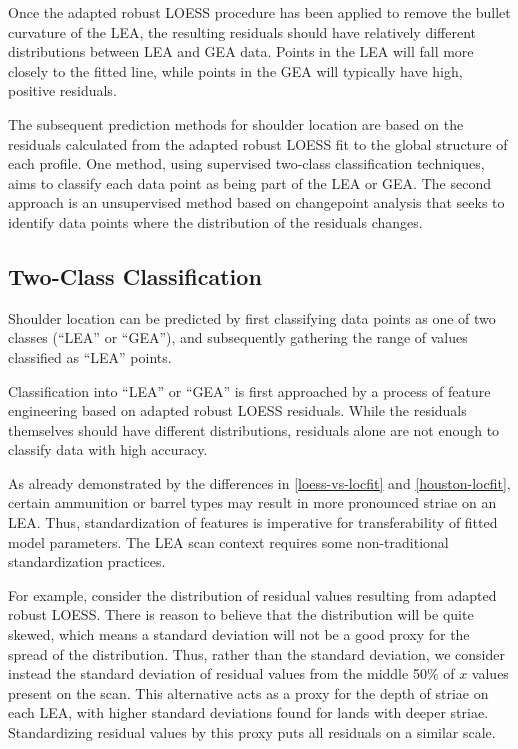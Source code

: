 \documentclass[12pt]{article}
\begin{document}
Once the adapted robust LOESS procedure has been applied to remove the
bullet curvature of the LEA, the resulting residuals should have
relatively different distributions between LEA and GEA data. Points in
the LEA will fall more closely to the fitted line, while points in the
GEA will typically have high, positive residuals.

The subsequent prediction methods for shoulder location are based on the
residuals calculated from the adapted robust LOESS fit to the global
structure of each profile. One method, using supervised two-class
classification techniques, aims to classify each data point as being
part of the LEA or GEA. The second approach is an unsupervised method
based on changepoint analysis that seeks to identify data points where
the distribution of the residuals changes.

\subsection{Two-Class Classification}

Shoulder location can be predicted by first classifying data points as
one of two classes (``LEA'' or ``GEA''), and subsequently gathering the
range of values classified as ``LEA'' points.

Classification into ``LEA'' or ``GEA'' is first approached by a process
of feature engineering based on adapted robust LOESS residuals. While
the residuals themselves should have different distributions, residuals
alone are not enough to classify data with high accuracy.

As already demonstrated by the differences in \autoref{loess-vs-locfit}
and \autoref{houston-locfit}, certain ammunition or barrel types may
result in more pronounced striae on an LEA. Thus, standardization of
features is imperative for transferability of fitted model parameters.
The LEA scan context requires some non-traditional standardization
practices.

For example, consider the distribution of residual values resulting from
adapted robust LOESS. There is reason to believe that the distribution
will be quite skewed, which means a standard deviation will not be a
good proxy for the spread of the distribution. Thus, rather than the
standard deviation, we consider instead the standard deviation of
residual values from the middle 50\% of \(x\) values present on the
scan. This alternative acts as a proxy for the depth of striae on each
LEA, with higher standard deviations found for lands with deeper striae.
Standardizing residual values by this proxy puts all residuals on a
similar scale.
\end{document}
